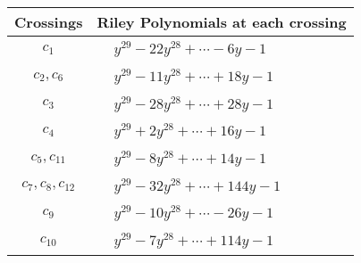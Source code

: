 \documentclass[1p]{elsarticle_modified}
\theoremstyle{definition}
\begin{document}
\begin{tabular}{m{50pt}|m{274pt}}
Crossings & \hspace{64pt}Riley Polynomials at each crossing \\
\hline $$\begin{aligned}c_{1}\end{aligned}$$&$\begin{aligned}
&y^{29}-22 y^{28}+\cdots-6 y-1
\end{aligned}$\\
\hline $$\begin{aligned}c_{2},c_{6}\end{aligned}$$&$\begin{aligned}
&y^{29}-11 y^{28}+\cdots+18 y-1
\end{aligned}$\\
\hline $$\begin{aligned}c_{3}\end{aligned}$$&$\begin{aligned}
&y^{29}-28 y^{28}+\cdots+28 y-1
\end{aligned}$\\
\hline $$\begin{aligned}c_{4}\end{aligned}$$&$\begin{aligned}
&y^{29}+2 y^{28}+\cdots+16 y-1
\end{aligned}$\\
\hline $$\begin{aligned}c_{5},c_{11}\end{aligned}$$&$\begin{aligned}
&y^{29}-8 y^{28}+\cdots+14 y-1
\end{aligned}$\\
\hline $$\begin{aligned}c_{7},c_{8},c_{12}\end{aligned}$$&$\begin{aligned}
&y^{29}-32 y^{28}+\cdots+144 y-1
\end{aligned}$\\
\hline $$\begin{aligned}c_{9}\end{aligned}$$&$\begin{aligned}
&y^{29}-10 y^{28}+\cdots-26 y-1
\end{aligned}$\\
\hline $$\begin{aligned}c_{10}\end{aligned}$$&$\begin{aligned}
&y^{29}-7 y^{28}+\cdots+114 y-1
\end{aligned}$\\
\hline
\end{tabular}\\~\\
\end{document}
